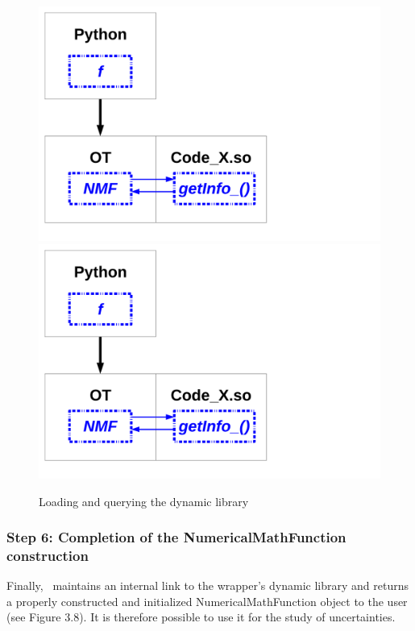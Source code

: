 \begin{figure}
  \begin{center}
    \ifpdf
    \includegraphics[width=12cm]{Figure7.pdf}
    \else
    \includegraphics[width=12cm]{Figure7.pdf}
    \fi
    \caption[Figure 7]{Loading and querying the dynamic library}
  \end{center}
\end{figure}

\subsubsection{Step 6: Completion of the NumericalMathFunction construction}

Finally, \OT\ maintains an internal link to the wrapper's dynamic library and returns a properly constructed and initialized NumericalMathFunction object to the user (see Figure 3.8). It is therefore possible to use it for the study of uncertainties.

